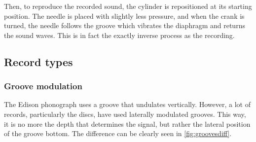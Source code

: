 Then, to reproduce the recorded sound, the cylinder is repositioned at its starting position. The needle is placed with slightly less pressure, and when the crank is turned, the needle follows the groove which vibrates the diaphragm and returns the sound waves. This is in fact the exactly inverse process as the recording.

\subsection{Record types}
\label{sec:rectypes}

\subsubsection{Groove modulation}

The Edison phonograph uses a groove that undulates vertically. However, a lot of records, particularly the discs, have used laterally modulated grooves. This way, it is no more the depth that determines the signal, but rather the lateral position of the groove bottom. The difference can be clearly seen in \autoref{fig:groovesdiff}.


